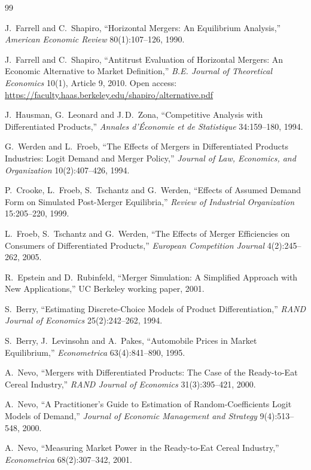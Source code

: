 \documentclass[11pt,a4paper]{article}
\begin{document}
\begin{thebibliography}{99}

J.~Farrell and C.~Shapiro, ``Horizontal Mergers: An Equilibrium Analysis,''
\emph{American Economic Review} 80(1):107--126, 1990.

J.~Farrell and C.~Shapiro, ``Antitrust Evaluation of Horizontal Mergers: An Economic
Alternative to Market Definition,'' \emph{B.E. Journal of Theoretical Economics}
10(1), Article 9, 2010. Open access: \url{https://faculty.haas.berkeley.edu/shapiro/alternative.pdf}

J.~Hausman, G.~Leonard and J.\,D.~Zona, ``Competitive Analysis with Differentiated
Products,'' \emph{Annales d'\'Economie et de Statistique} 34:159--180, 1994.

G.~Werden and L.~Froeb, ``The Effects of Mergers in Differentiated Products Industries:
Logit Demand and Merger Policy,'' \emph{Journal of Law, Economics, and Organization}
10(2):407--426, 1994.

P.~Crooke, L.~Froeb, S.~Tschantz and G.~Werden, ``Effects of Assumed Demand Form on
Simulated Post-Merger Equilibria,'' \emph{Review of Industrial Organization}
15:205--220, 1999.

L.~Froeb, S.~Tschantz and G.~Werden, ``The Effects of Merger Efficiencies on Consumers of
Differentiated Products,'' \emph{European Competition Journal} 4(2):245--262, 2005.

R.~Epstein and D.~Rubinfeld, ``Merger Simulation: A Simplified Approach with New
Applications,'' UC Berkeley working paper, 2001.

S.~Berry, ``Estimating Discrete-Choice Models of Product Differentiation,''
\emph{RAND Journal of Economics} 25(2):242--262, 1994.

S.~Berry, J.~Levinsohn and A.~Pakes, ``Automobile Prices in Market Equilibrium,''
\emph{Econometrica} 63(4):841--890, 1995.

A.~Nevo, ``Mergers with Differentiated Products: The Case of the Ready-to-Eat Cereal
Industry,'' \emph{RAND Journal of Economics} 31(3):395--421, 2000.

A.~Nevo, ``A Practitioner's Guide to Estimation of Random-Coefficients Logit Models of
Demand,'' \emph{Journal of Economic Management and Strategy} 9(4):513--548, 2000.

A.~Nevo, ``Measuring Market Power in the Ready-to-Eat Cereal Industry,''
\emph{Econometrica} 68(2):307--342, 2001.


\end{thebibliography}
\end{document}
